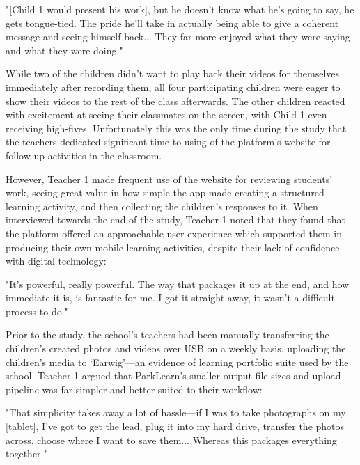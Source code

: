 \begin{displayquote}
"[Child 1 would present his work], but he doesn't know what he’s going to say, he gets tongue-tied. The pride he’ll take in actually being able to give a coherent message and seeing himself back... They far more enjoyed what they were saying and what they were doing."
\end{displayquote}

While two of the children didn’t want to play back their videos for themselves immediately after recording them, all four participating children were eager to show their videos to the rest of the class afterwards. The other children reacted with excitement at seeing their classmates on the screen, with Child 1 even receiving high-fives. Unfortunately this was the only time during the study that the teachers dedicated significant time to using of the platform's website for follow-up activities in the classroom.

However, Teacher 1 made frequent use of the website for reviewing students' work, seeing great value in how simple the app made creating a structured learning activity, and then collecting the children’s responses to it. When interviewed towards the end of the study, Teacher 1 noted that they found that the platform offered an approachable user experience which supported them in producing their own mobile learning activities, despite their lack of confidence with digital technology:

\begin{displayquote}
"It’s powerful, really powerful. The way that packages it up at the end, and how immediate it is, is fantastic for me. I got it straight away, it wasn't a difficult process to do."
\end{displayquote}

Prior to the study, the school’s teachers had been manually transferring the children’s created photos and videos over USB on a weekly basis, uploading the children’s media to `Earwig'---an evidence of learning portfolio suite used by the school. Teacher 1 argued that ParkLearn’s smaller output file sizes and upload pipeline was far simpler and better suited to their workflow:

\begin{displayquote}
"That simplicity takes away a lot of hassle---if I was to take photographs on my [tablet], I've got to get the lead, plug it into my hard drive, transfer the photos across, choose where I want to save them... Whereas this packages everything together."
\end{displayquote}

